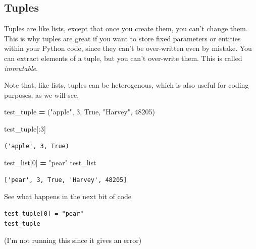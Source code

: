 \documentclass[
  letterpaper,
]{scrbook}
\newenvironment{Shaded}{\begin{snugshade}}{\end{snugshade}}
\newcommand{\DecValTok}[1]{\textcolor[rgb]{0.00,0.00,0.81}{#1}}
\newcommand{\NormalTok}[1]{#1}
\newcommand{\OperatorTok}[1]{\textcolor[rgb]{0.81,0.36,0.00}{\textbf{#1}}}
\newcommand{\StringTok}[1]{\textcolor[rgb]{0.31,0.60,0.02}{#1}}
\newcommand{\VariableTok}[1]{\textcolor[rgb]{0.00,0.00,0.00}{#1}}
\begin{document}
\hypertarget{tuples}{%
\subsection{Tuples}\label{tuples}}

Tuples are like lists, except that once you create them, you can't change them.
This is why tuples are great if you want to store fixed parameters or entities
within your Python code, since they can't be over-written even by mistake. You
can extract elements of a tuple, but you can't over-write them. This is called
\emph{immutable}.

Note that, like lists, tuples can be heterogenous, which is also useful for coding purposes, as we will see.

\begin{Shaded}
\begin{Highlighting}[]
\NormalTok{test_tuple }\OperatorTok{=}\NormalTok{ (}\StringTok{"apple"}\NormalTok{, }\DecValTok{3}\NormalTok{, }\VariableTok{True}\NormalTok{, }\StringTok{"Harvey"}\NormalTok{, }\DecValTok{48205}\NormalTok{)}
\end{Highlighting}
\end{Shaded}

\begin{Shaded}
\begin{Highlighting}[]
\NormalTok{test_tuple[:}\DecValTok{3}\NormalTok{]}
\end{Highlighting}
\end{Shaded}

\begin{verbatim}
('apple', 3, True)
\end{verbatim}

\begin{Shaded}
\begin{Highlighting}[]
\NormalTok{test_list[}\DecValTok{0}\NormalTok{] }\OperatorTok{=} \StringTok{"pear"}
\NormalTok{test_list}
\end{Highlighting}
\end{Shaded}

\begin{verbatim}
['pear', 3, True, 'Harvey', 48205]
\end{verbatim}

See what happens in the next bit of code

\begin{verbatim}
test_tuple[0] = "pear"
test_tuple
\end{verbatim}

(I'm not running this since it gives an error)
\end{document}
